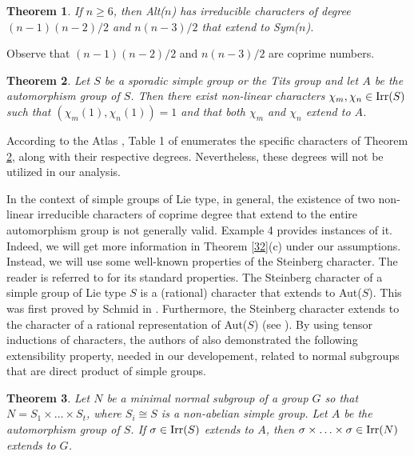 \documentclass[12pt,leqno,a4paper]{amsart}
\newtheorem{theorem}{Theorem}[section]
\numberwithin{equation}{section}
\begin{document}
\begin{theorem} {\normalfont  \cite[Theorem 3]{BCLP}}\label{3}
If $n\geq 6$, then  {\rm Alt($n$)} has irreducible characters of degree $(n-1)(n-2)/2$ and  $n(n-3)/2$ that extend to {\rm Sym($n$)}.
 \end{theorem}

 Observe that $(n-1)(n-2)/2$ and  $n(n-3)/2$ are coprime
numbers.

\begin{theorem} {\normalfont  \cite[Theorem 4]{BCLP}} \label{4} Let $S$ be a sporadic simple group or the Tits group and let $A$ be the automorphism group of $S$. Then there exist non-linear characters $\chi_m,\chi_n \in{\rm Irr}(S)$ such that $(\chi_m(1),\chi_n(1))=1$ and that both $\chi_m$ and $\chi_n$ extend to $A$.
\end{theorem}

 According to the Atlas \cite{atlas},  Table 1 of \cite{BCLP}   enumerates the specific characters of Theorem \ref{4}, along with their respective degrees. Nevertheless, these degrees will not be utilized in our analysis.

\medskip
 In the context of simple groups of Lie type, in general, the existence of two non-linear irreducible characters of coprime degree that extend to the entire automorphism group is not generally valid.  Example 4 provides instances of it. Indeed, we will get more information in Theorem \ref{32}(c) under our assumptions. Instead, we will use some well-known properties of the Steinberg character. The reader is referred to \cite{Carter} for its standard properties. The Steinberg character of a simple group of Lie type $S$ is a (rational) character that extends to  Aut($S$).  This was first proved by Schmid in \cite{Schmid1, Schmid2}. Furthermore,  the Steinberg character extends to the character of a rational representation of Aut($S$) (see \cite{Feit}).
   By using tensor inductions of characters, the authors of \cite{BCLP} also demonstrated the following extensibility property, needed in our developement, related to normal subgroups that are direct product of simple groups.


\begin{theorem} {\normalfont  \cite[Lemma 5]{BCLP}} \label{5}
Let $N$ be a minimal normal subgroup of a group $G$ so that $N = S_1 \times \ldots \times S_t$, where $S_i\cong S$ is a  non-abelian simple group. Let $A$ be the automorphism group of $S$. If $\sigma \in {\rm Irr}(S)$ extends to $A$, then $\sigma \times \ldots \times \sigma \in {\rm Irr}(N)$ extends to $G$.
\end{theorem}
\end{document}
